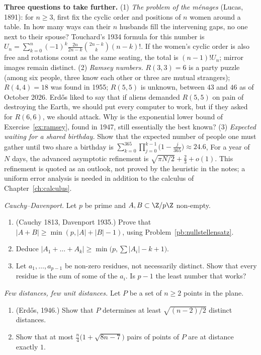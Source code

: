 \begin{challenge}
\textbf{Three questions to take further.} (1) \emph{The problem of the m\'enages} (Lucas, 1891): for $n\ge3$, first fix the cyclic order and positions of $n$ women around a table. In how many ways can their $n$ husbands fill the intervening gaps, no one next to their spouse? Touchard's 1934 formula for this number is $U_n=\sum_{k=0}^n(-1)^k\frac{2n}{2n-k}\binom{2n-k}k(n-k)!$. If the women's cyclic order is also free and rotations count as the same seating, the total is $(n-1)!U_n$; mirror images remain distinct. (2) \emph{Ramsey numbers.} $R(3,3)=6$ is a party puzzle (among six people, three know each other or three are mutual strangers); $R(4,4)=18$ was found in 1955; $R(5,5)$ is unknown, between $43$ and $46$ as of October 2026. Erd\H os liked to say that if aliens demanded $R(5,5)$ on pain of destroying the Earth, we should put every computer to work, but if they asked for $R(6,6)$, we should attack. Why is the exponential lower bound of Exercise~\ref{ex:ramsey}, found in 1947, still essentially the best known? (3) \emph{Expected waiting for a shared birthday.} Show that the expected number of people one must gather until two share a birthday is $\sum_{k=0}^{365}\prod_{j=0}^{k-1}\big(1-\frac j{365}\big)\approx24.6$, For a year of $N$ days, the advanced asymptotic refinement is $\sqrt{\pi N/2}+\frac23+o(1)$. This refinement is quoted as an outlook, not proved by the heuristic in the notes; a uniform error analysis is needed in addition to the calculus of Chapter~\ref{ch:calculus}.
\end{challenge}

\begin{exercise}[$\star\star$]\label{pb:cauchydav}
\emph{Cauchy--Davenport.} Let $p$ be prime and $A,B\subset\Z/p\Z$ non-empty.
\begin{enumerate}[label=(\alph*)]
\item (Cauchy 1813, Davenport 1935.) Prove that $|A+B|\ge\min(p,|A|+|B|-1)$, using Problem~\ref{pb:nullstellensatz}.
\item Deduce $|A_1+\dots+A_k|\ge\min\bigl(p,\sum|A_i|-k+1\bigr)$.
\item Let $a_1,\dots,a_{p-1}$ be non-zero residues, not necessarily distinct. Show that every residue is the sum of some of the
$a_i$. Is $p-1$ the least number that works?
\end{enumerate}
\end{exercise}

\begin{exercise}[$\star\star$]\label{pb:distances}
\emph{Few distances, few unit distances.} Let $P$ be a set of $n\ge2$ points in the plane.
\begin{enumerate}[label=(\alph*)]
\item (Erdős, 1946.) Show that $P$ determines at least $\sqrt{(n-2)/2}$ distinct distances.
\item Show that at most $\frac n4\bigl(1+\sqrt{8n-7}\bigr)$ pairs of points of $P$ are at distance exactly $1$.
\end{enumerate}
\end{exercise}

